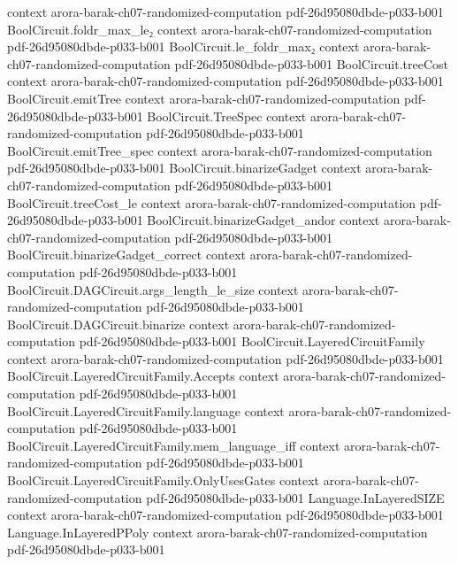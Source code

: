 \begin{theorem}
  {context}
  {arora-barak-ch07-randomized-computation}
  {pdf-26d95080dbde-p033-b001}
\proofstep
  {BoolCircuit.foldr_max_le₂}
  {context}
  {arora-barak-ch07-randomized-computation}
  {pdf-26d95080dbde-p033-b001}
\proofstep
  {BoolCircuit.le_foldr_max₂}
  {context}
  {arora-barak-ch07-randomized-computation}
  {pdf-26d95080dbde-p033-b001}
\proofstep
  {BoolCircuit.treeCost}
  {context}
  {arora-barak-ch07-randomized-computation}
  {pdf-26d95080dbde-p033-b001}
\proofstep
  {BoolCircuit.emitTree}
  {context}
  {arora-barak-ch07-randomized-computation}
  {pdf-26d95080dbde-p033-b001}
\proofstep
  {BoolCircuit.TreeSpec}
  {context}
  {arora-barak-ch07-randomized-computation}
  {pdf-26d95080dbde-p033-b001}
\proofstep
  {BoolCircuit.emitTree_spec}
  {context}
  {arora-barak-ch07-randomized-computation}
  {pdf-26d95080dbde-p033-b001}
\proofstep
  {BoolCircuit.binarizeGadget}
  {context}
  {arora-barak-ch07-randomized-computation}
  {pdf-26d95080dbde-p033-b001}
\proofstep
  {BoolCircuit.treeCost_le}
  {context}
  {arora-barak-ch07-randomized-computation}
  {pdf-26d95080dbde-p033-b001}
\proofstep
  {BoolCircuit.binarizeGadget_andor}
  {context}
  {arora-barak-ch07-randomized-computation}
  {pdf-26d95080dbde-p033-b001}
\proofstep
  {BoolCircuit.binarizeGadget_correct}
  {context}
  {arora-barak-ch07-randomized-computation}
  {pdf-26d95080dbde-p033-b001}
\proofstep
  {BoolCircuit.DAGCircuit.args_length_le_size}
  {context}
  {arora-barak-ch07-randomized-computation}
  {pdf-26d95080dbde-p033-b001}
\proofstep
  {BoolCircuit.DAGCircuit.binarize}
  {context}
  {arora-barak-ch07-randomized-computation}
  {pdf-26d95080dbde-p033-b001}
\proofstep
  {BoolCircuit.LayeredCircuitFamily}
  {context}
  {arora-barak-ch07-randomized-computation}
  {pdf-26d95080dbde-p033-b001}
\proofstep
  {BoolCircuit.LayeredCircuitFamily.Accepts}
  {context}
  {arora-barak-ch07-randomized-computation}
  {pdf-26d95080dbde-p033-b001}
\proofstep
  {BoolCircuit.LayeredCircuitFamily.language}
  {context}
  {arora-barak-ch07-randomized-computation}
  {pdf-26d95080dbde-p033-b001}
\proofstep
  {BoolCircuit.LayeredCircuitFamily.mem_language_iff}
  {context}
  {arora-barak-ch07-randomized-computation}
  {pdf-26d95080dbde-p033-b001}
\proofstep
  {BoolCircuit.LayeredCircuitFamily.OnlyUsesGates}
  {context}
  {arora-barak-ch07-randomized-computation}
  {pdf-26d95080dbde-p033-b001}
\proofstep
  {Language.InLayeredSIZE}
  {context}
  {arora-barak-ch07-randomized-computation}
  {pdf-26d95080dbde-p033-b001}
\proofstep
  {Language.InLayeredPPoly}
  {context}
  {arora-barak-ch07-randomized-computation}
  {pdf-26d95080dbde-p033-b001}

\end{theorem}
